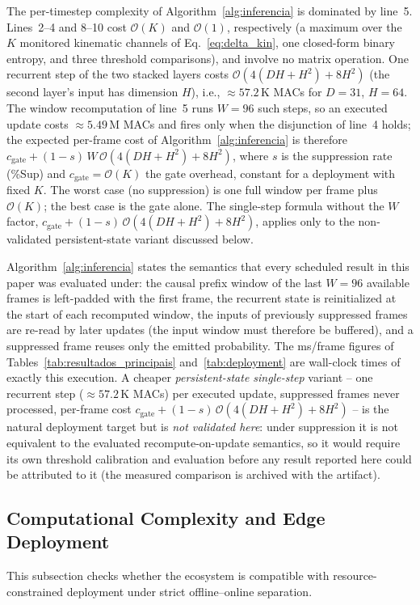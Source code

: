 \documentclass[a4paper,fleqn]{cas-dc}
\begin{document}
{\color{\revcolor}The per-timestep complexity of Algorithm~\ref{alg:inferencia} is
dominated by line~5. Lines~2--4 and 8--10 cost $\mathcal{O}(K)$ and
$\mathcal{O}(1)$, respectively (a maximum over the $K$ monitored kinematic
channels of Eq.~\ref{eq:delta_kin}, one closed-form binary entropy, and three
threshold comparisons),
and involve no matrix operation. One recurrent step of the two stacked
layers costs $\mathcal{O}(4(DH{+}H^2)+8H^2)$ (the second layer's input has
dimension $H$), i.e., ${\approx}57.2$\,K MACs for $D{=}31$, $H{=}64$. The
window recomputation of line~5 runs $W{=}96$ such steps, so an executed
update costs ${\approx}5.49$\,M MACs and fires only when the disjunction of
line~4 holds; the expected per-frame cost of
Algorithm~\ref{alg:inferencia} is therefore $c_{\mathrm{gate}} +
(1-s)\,W\,\mathcal{O}(4(DH{+}H^2)+8H^2)$, where $s$ is the suppression rate
(\%Sup) and $c_{\mathrm{gate}} = \mathcal{O}(K)$ the gate overhead,
constant for a deployment with fixed $K$. The worst case (no suppression)
is one full window per frame plus $\mathcal{O}(K)$; the best case is the
gate alone. The single-step formula without the $W$ factor,
$c_{\mathrm{gate}} + (1-s)\,\mathcal{O}(4(DH{+}H^2)+8H^2)$, applies only to
the non-validated persistent-state variant discussed below.

Algorithm~\ref{alg:inferencia} states the semantics that every scheduled
result in this paper was evaluated under: the causal prefix window of the
last $W{=}96$ available frames is left-padded with the first frame, the
recurrent state is reinitialized at the start of each recomputed window, the
inputs of previously suppressed frames are re-read by later updates (the
input window must therefore be buffered), and a suppressed frame reuses only
the emitted probability. The ms/frame figures of
Tables~\ref{tab:resultados_principais}
and~\ref{tab:deployment} are wall-clock times of exactly this execution.
A cheaper \emph{persistent-state single-step} variant -- one recurrent step
(${\approx}57.2$\,K MACs) per executed update, suppressed frames never
processed, per-frame cost $c_{\mathrm{gate}} +
(1-s)\,\mathcal{O}(4(DH{+}H^2)+8H^2)$ -- is the natural deployment target
but is \emph{not validated here}: under suppression it is not equivalent to
the evaluated recompute-on-update semantics, so it would require its own
threshold calibration and evaluation before any result reported here could
be attributed to it (the measured comparison is archived with the
artifact).}
\subsection{Computational Complexity and Edge Deployment}
\label{sec:complexidade}
This subsection checks whether the ecosystem is compatible with resource-constrained deployment under strict offline--online separation.
\end{document}
